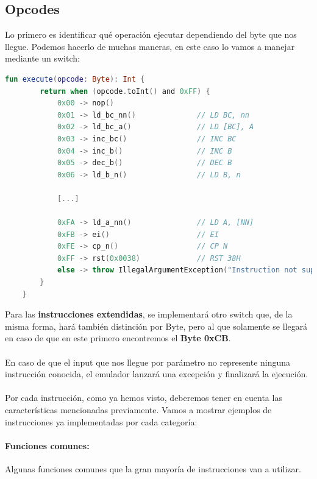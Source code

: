 \subsection{Opcodes}

Lo primero es identificar qué operación ejecutar dependiendo del byte que nos llegue. Podemos hacerlo de muchas maneras, en este caso lo vamos a manejar mediante un switch:

\begin{lstlisting}[language=Kotlin, caption={Identificación de Opcode}, label={code:kotlinwhen}]
    fun execute(opcode: Byte): Int {
        return when (opcode.toInt() and 0xFF) {
            0x00 -> nop()
            0x01 -> ld_bc_nn()              // LD BC, nn
            0x02 -> ld_bc_a()               // LD [BC], A
            0x03 -> inc_bc()                // INC BC
            0x04 -> inc_b()                 // INC B
            0x05 -> dec_b()                 // DEC B
            0x06 -> ld_b_n()                // LD B, n

            [...]

            0xFA -> ld_a_nn()               // LD A, [NN]
            0xFB -> ei()                    // EI
            0xFE -> cp_n()                  // CP N
            0xFF -> rst(0x0038)             // RST 38H
            else -> throw IllegalArgumentException("Instruction not supported: ${opcode.toInt() and 0xFF}")
        }
    }       
\end{lstlisting}

Para las \textbf{instrucciones extendidas}, se implementará otro switch que, de la misma forma, hará también distinción por Byte, pero al que solamente se llegará en caso de que en este primero encontremos el \textbf{Byte 0xCB}.
\\\\
En caso de que el input que nos llegue por parámetro no represente ninguna instrucción conocida, el emulador lanzará una excepción y finalizará la ejecución.
\\\\
Por cada instrucción, como ya hemos visto, deberemos tener en cuenta las características mencionadas previamente. Vamos a mostrar ejemplos de instrucciones ya implementadas por cada categoría:

\paragraph{Funciones comunes:}
Algunas funciones comunes que la gran mayoría de instrucciones van a utilizar.

